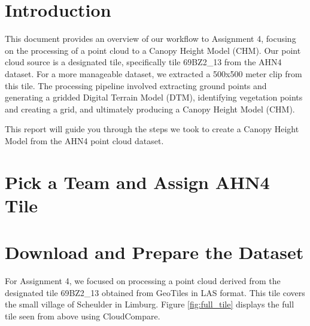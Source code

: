 \documentclass{article}
\begin{document}

\newpage

\tableofcontents
\newpage


\section{Introduction}

This document provides an overview of our workflow to Assignment 4, focusing on the processing of a point cloud to a Canopy Height Model (CHM). Our point cloud source is a designated tile, specifically tile 69BZ2\_13 from the AHN4 dataset. For a more manageable dataset, we extracted a 500x500 meter clip from this tile. The processing pipeline involved extracting ground points and generating a gridded Digital Terrain Model (DTM), identifying vegetation points and creating a grid, and ultimately producing a Canopy Height Model (CHM).

This report will guide you through the steps we took to create a Canopy Height Model from the AHN4 point cloud dataset.
\newpage

\section{Pick a Team and Assign AHN4 Tile}
\newpage


\section{Download and Prepare the Dataset}

For Assignment 4, we focused on processing a point cloud derived from the designated tile 69BZ2\_13 obtained from GeoTiles in LAS format. This tile covers the small village of Scheulder in Limburg. Figure \ref{fig:full_tile} displays the full tile seen from above using CloudCompare.
\end{document}
